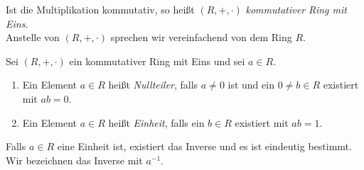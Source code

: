 \begin{bem} %
Ist die Multiplikation kommutativ, so heißt $\left(R, +, \cdot\right)$ \textit{kommutativer Ring mit Eins}. \\
Anstelle von $\left(R, +, \cdot\right)$ sprechen wir vereinfachend von dem Ring $R$.
\end{bem}
%
\begin{defn}\label{definitionEinheitNullteiler}
Sei $\left(R, +, \cdot\right)$ ein kommutativer Ring mit Eins und sei $a \in R$.
\begin{enumerate}
\item Ein Element $a \in R$ heißt \textit{Nullteiler}, falls $a \neq 0$ ist und ein $0 \neq b \in R$ existiert mit $ab =0$.
\item Ein Element $a \in R$ heißt \textit{Einheit}, falls ein $b \in R$ existiert mit $ab = 1$. 
\end{enumerate}
\end{defn}
%
%
%
\begin{bem}
Falls $a\in R$ eine Einheit ist, existiert das Inverse und es ist eindeutig bestimmt. Wir bezeichnen das Inverse mit $a^{-1}$.
\end{bem}

